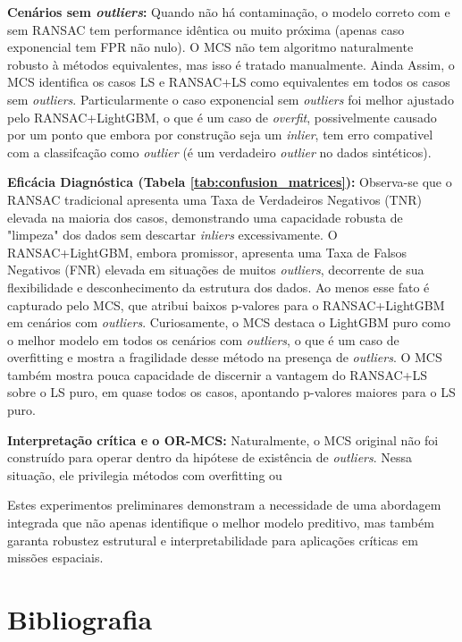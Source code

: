 \documentclass[12pt,a4paper]{article}
\newcommand{\inlier}{\textit{inlier}}
\newcommand{\inliers}{\textit{inliers}}
\newcommand{\outlier}{\textit{outlier}}
\newcommand{\outliers}{\textit{outliers}}
\newcommand{\overfit}{\textit{overfit}}
\begin{document}
\textbf{Cenários sem \outliers{}:} Quando não há contaminação, o modelo correto com e sem RANSAC tem performance idêntica ou muito próxima (apenas caso exponencial tem FPR não nulo). O MCS não tem algoritmo naturalmente robusto à métodos equivalentes, mas isso é tratado manualmente. Ainda Assim, o MCS identifica os casos LS e RANSAC+LS como equivalentes em todos os casos sem \outliers{}. Particularmente o caso exponencial sem \outliers{} foi melhor ajustado pelo RANSAC+LightGBM, o que é um caso de \overfit{}, possivelmente causado por um ponto que embora por construção seja um \inlier, tem erro compativel com a classifcação como \outlier{} (é um verdadeiro \outlier{} no dados sintéticos).

\textbf{Eficácia Diagnóstica (Tabela \ref{tab:confusion_matrices}):} Observa-se que o RANSAC tradicional apresenta uma Taxa de Verdadeiros Negativos (TNR) elevada na maioria dos casos, demonstrando uma capacidade robusta de "limpeza" dos dados sem descartar \inliers{} excessivamente. O RANSAC+LightGBM, embora promissor, apresenta uma Taxa de Falsos Negativos (FNR) elevada em situações de muitos \outliers{}, decorrente de sua flexibilidade e desconhecimento da estrutura dos dados. Ao menos esse fato é capturado pelo MCS, que atribui baixos p-valores para o RANSAC+LightGBM em cenários com \outliers{}. Curiosamente, o MCS destaca o LightGBM puro como o melhor modelo em todos os cenários com \outliers{}, o que é um caso de overfitting e mostra a fragilidade desse método na presença de \outliers{}. O MCS também mostra pouca capacidade de discernir a vantagem do RANSAC+LS sobre o LS puro, em quase todos os casos, apontando p-valores maiores para o LS puro.

\textbf{Interpretação crítica e o OR-MCS:} Naturalmente, o MCS original não foi construído para operar dentro da hipótese de existência de \outliers{}. Nessa situação, ele privilegia métodos com overfitting ou

Estes experimentos preliminares demonstram a necessidade de uma abordagem integrada que não apenas identifique o melhor modelo preditivo, mas também garanta robustez estrutural e interpretabilidade para aplicações críticas em missões espaciais.

\section{Bibliografia}
\end{document}

